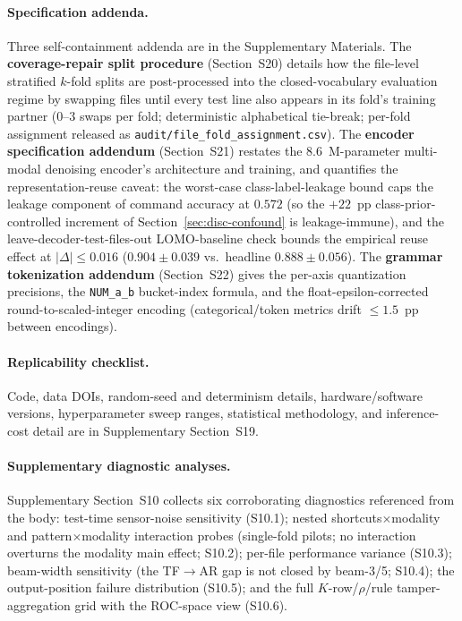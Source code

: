 \documentclass[sensors,article,submit,moreauthors,pdftex]{Definitions/mdpi}
\begin{document}
\paragraph{Specification addenda.} Three self-containment addenda are in the Supplementary Materials. The \textbf{coverage-repair split procedure} (Section~S20) details how the file-level stratified $k$-fold splits are post-processed into the closed-vocabulary evaluation regime by swapping files until every test line also appears in its fold's training partner ($0$--$3$ swaps per fold; deterministic alphabetical tie-break; per-fold assignment released as \texttt{audit/file\_fold\_assignment.csv}). The \textbf{encoder specification addendum} (Section~S21) restates the 8.6~M-parameter multi-modal denoising encoder's architecture and training, and quantifies the representation-reuse caveat: the worst-case class-label-leakage bound caps the leakage component of command accuracy at $0.572$ (so the $+22$~pp class-prior-controlled increment of Section~\ref{sec:disc-confound} is leakage-immune), and the leave-decoder-test-files-out LOMO-baseline check bounds the empirical reuse effect at $|\Delta|\!\le\!0.016$ ($0.904 \pm 0.039$ vs.\ headline $0.888 \pm 0.056$). The \textbf{grammar tokenization addendum} (Section~S22) gives the per-axis quantization precisions, the \texttt{NUM\_a\_b} bucket-index formula, and the float-epsilon-corrected round-to-scaled-integer encoding (categorical/token metrics drift $\le\!1.5$~pp between encodings).

\paragraph{Replicability checklist.}\label{app:replicability} Code, data DOIs, random-seed and determinism details, hardware/software versions, hyperparameter sweep ranges, statistical methodology, and inference-cost detail are in Supplementary Section~S19.

\paragraph{Supplementary diagnostic analyses.}\label{app:diagnostics} Supplementary Section~S10 collects six corroborating diagnostics referenced from the body: test-time sensor-noise sensitivity (S10.1); nested shortcuts$\times$modality and pattern$\times$modality interaction probes (single-fold pilots; no interaction overturns the modality main effect; S10.2); per-file performance variance (S10.3); beam-width sensitivity (the TF$\to$AR gap is not closed by beam-3/5; S10.4); the output-position failure distribution (S10.5); and the full $K$-row/$\rho$/rule tamper-aggregation grid with the ROC-space view (S10.6).
\end{document}
